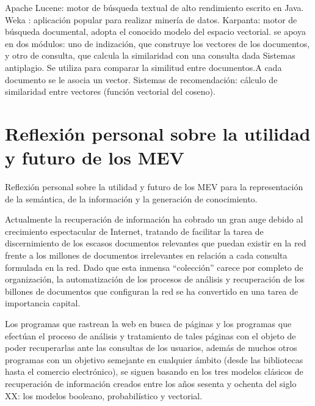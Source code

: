 \documentclass{article}
\begin{document}
Apache Lucene: motor de búsqueda textual de alto rendimiento escrito 
en Java. 
Weka : aplicación popular para realizar minería de datos. 
Karpanta: motor de búsqueda documental, adopta el conocido modelo 
del espacio vectorial. se apoya en dos módulos: uno de indización, que 
construye  los  vectores  de  los  documentos,  y  otro  de  consulta,  que 
calcula la similaridad con una consulta dada 
Sistemas  antiplagio.  Se  utiliza  para  comparar  la  similitud  entre 
documentos.A cada documento se le asocia un vector.  
Sistemas  de  recomendación:  cálculo  de  similaridad  entre  vectores 
(función vectorial del coseno). 

\section{Reflexión personal sobre la utilidad y futuro de los MEV}

Reflexión personal sobre la utilidad y futuro de los MEV para la representación de la semántica, de la información y la generación de conocimiento.



Actualmente la recuperación de información ha cobrado un gran auge debido al crecimiento espectacular de Internet, tratando de facilitar la tarea de discernimiento de los escasos documentos relevantes que puedan existir en la red frente a los millones de documentos irrelevantes en relación a cada consulta formulada en la red. Dado que esta inmensa “colección” carece por completo de organización, la automatización de los procesos de análisis y recuperación de los billones de documentos que configuran la red se ha convertido en una tarea de importancia capital.

Los programas que rastrean la web en busca de páginas y los programas que efectúan el proceso de análisis y tratamiento de tales páginas con el objeto de poder recuperarlas ante las consultas de los usuarios, además de muchos otros programas con un objetivo semejante en cualquier ámbito (desde las bibliotecas hasta el comercio electrónico), se siguen basando en los tres modelos clásicos de recuperación de información creados entre los años sesenta y ochenta del siglo XX: los modelos booleano, probabilístico y vectorial. 
\end{document}
